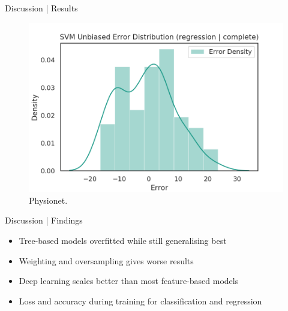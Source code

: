 \documentclass{beamer}
\begin{document}
    \begin{frame}{Discussion | Results}
        \begin{figure}[hbt]
        	\center
        	\includegraphics[width=1.0\textwidth]{img/physionet_svm_regression_complete_error_distribution_unbiased.png}
        	\caption{Physionet.}
        	\label{fig:example_error_distribution}
        \end{figure}
    \end{frame}
    
    \begin{frame}{Discussion | Findings}
        \begin{itemize}
            \item Tree-based models overfitted while still generalising best
            \item Weighting and oversampling gives worse results
            \item Deep learning scales better than most feature-based models
            \item Loss and accuracy during training for classification and regression
        \end{itemize}
    \end{frame}
    
\end{document}
